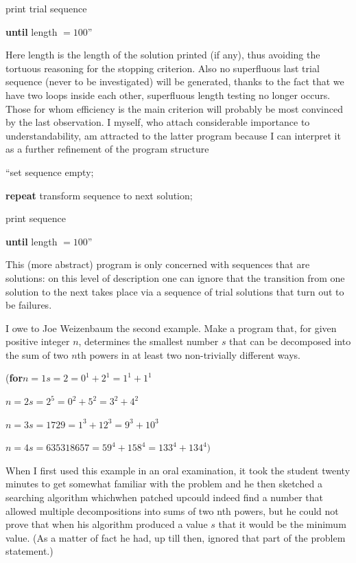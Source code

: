 \quad \quad print trial sequence

\quad \textbf{until} length $= 100$''

Here length is the length of the solution printed (if any), thus avoiding the tortuous reasoning for the stopping criterion. Also no superfluous last trial sequence (never to be investigated) will be generated, thanks to the fact that we have two loops inside each other, superfluous length testing no longer occurs. Those for whom efficiency is the main criterion will probably be most convinced by the last observation. I myself, who attach considerable importance to understandability, am attracted to the latter program because I can interpret it as a further refinement of the program structure

\quad \hspace{-.4em}``set sequence empty;

\quad \textbf{repeat} transform sequence to next solution;

\quad \quad print sequence

\quad \textbf{until} length $= 100$''

This (more abstract) program is only concerned with sequences that are solutions: on this level of description one can ignore that the transition from one solution to the next takes place via a sequence of trial solutions that turn out to be failures.

I owe to Joe Weizenbaum the second example. Make a program that, for given positive integer $n$, determines the smallest number $s$ that can be decomposed into the sum of two $n$th powers in at least two non-trivially different ways.

\noindent
(\textbf{for}\tabto{2em}$n = 1$\tabto{6em}$s = 2 = 0^1 + 2^1 = 1^1 + 1^1$

\tabto{2em}$n = 2$\tabto{6em}$s = 2^5 = 0^2 + 5^2 = 3^2 + 4^2$

\tabto{2em}$n=3$\tabto{6em}$s=1729=1^3 +12^3 =9^3 +10^3$

\tabto{2em}$n = 4$\tabto{6em}$s = 635318657 = 59^4 + 158^4 = 133^4 + 134^4)$

When I first used this example in an oral examination, it took the student twenty minutes to get somewhat familiar with the problem and he then sketched a searching algorithm which\textemdash{}when patched up\textemdash{}could indeed find a number that allowed multiple decompositions into sums of two nth powers, but he could not prove that when his algorithm produced a value $s$ that it would be the minimum value. (As a matter of fact he had, up till then, ignored that part of the problem statement.)

